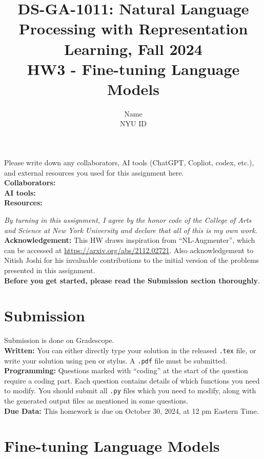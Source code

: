 \documentclass{article}
\title{\textbf{DS-GA-1011: Natural Language Processing with Representation Learning, Fall 2024} \\HW3 - Fine-tuning Language Models}
\author{Name \\
NYU ID}
\date{}
\theoremstyle{case}
\theoremstyle{definition}
\begin{document}
\maketitle

\begin{tcolorbox}
Please write down any collaborators, AI tools (ChatGPT, Copliot, codex, etc.), and external resources you used for this assignment here. \\
\textbf{Collaborators:} \\
\textbf{AI tools:} \\
\textbf{Resources:}
\end{tcolorbox}
\textit{By turning in this assignment, I agree by the honor code of the College of Arts and Science at New York University and declare
that all of this is my own work.} \\

\textbf{Acknowledgement:} This HW draws inspiration from ``NL-Augmenter'', which can be accessed at \url{https://arxiv.org/abs/2112.02721}. Also acknowledgement to Nitish Joshi for his invaluable contributions to the initial version of the problems presented in this assignment. \\


\textbf{Before you get started, please read the Submission section thoroughly}.

\section*{Submission}
Submission is done on Gradescope. \\

\textbf{Written:} You can either directly type your solution in the released \texttt{.tex} file,
or write your solution using pen or stylus.
A \texttt{.pdf} file must be submitted.\\

\textbf{Programming:} Questions marked with ``coding'' at the start of the question require a coding part. Each question contains details of which functions you need to modify. You should submit all \texttt{.py} files which you need to modify, along with the generated output files as mentioned in some questions. \\

\textbf{Due Data:} This homework is due on October 30, 2024, at 12 pm Eastern Time.

\section*{Fine-tuning Language Models}
\end{document}
